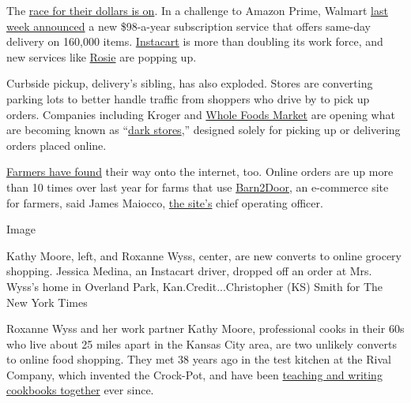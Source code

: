 The
\href{https://www.supermarketnews.com/online-retail/retailers-ramp-their-online-grocery-offerings-amid-continuing-pandemic/gallery?slide=13}{race
for their dollars is on}. In a challenge to Amazon Prime, Walmart
\href{https://www.detroitnews.com/story/business/2020/09/01/years-later-walmart-launches-answer-amazon-prime/113639782/}{last
week announced} a new \$98-a-year subscription service that offers
same-day delivery on 160,000 items.
\href{https://www.instacart.com/?click_id=EAIaIQobChMI3ayi5erP6wIVjMDICh0znwh3EAAYASAAEgIHuvD_BwE\&utm_medium=sem\&utm_source=instacart_google\&utm_campaign=ad_demand_search_brand_mkag_us-na-catchall_exact_us_LTV_Test\&utm_content=accountid-1732890876_campaignid-10842730770_adgroupid-104896959977_device-c\&utm_term=matchtype-e_keyword-instacart_targetid-kwd-297369219725_locationid-9060351\&kskwid=6106173\&ksadid=6107435\&gclid=EAIaIQobChMI3ayi5erP6wIVjMDICh0znwh3EAAYASAAEgIHuvD_BwE}{Instacart}
is more than doubling its work force, and new services like
\href{https://www.rosieapp.com/}{Rosie} are popping up.

Curbside pickup, delivery's sibling, has also exploded. Stores are
converting parking lots to better handle traffic from shoppers who drive
by to pick up orders. Companies including Kroger and
\href{https://www.wholefoodsmarket.com/stores?gclid=EAIaIQobChMIyoev9OrP6wIVYuW1Ch0v0Q-UEAAYASAAEgJILPD_BwE}{Whole
Foods Market} are opening what are becoming known as
``\href{https://www.supermarketnews.com/online-retail/whole-foods-opens-online-only-dark-store-brooklyn}{dark
stores},'' designed solely for picking up or delivering orders placed
online.

\href{https://www.localfarmfinder.com/}{Farmers have found} their way
onto the internet, too. Online orders are up more than 10 times over
last year for farms that use
\href{https://www.barn2door.com/}{Barn2Door,} an e-commerce site for
farmers, said James Maiocco,
\href{https://www.organicauthority.com/buzz-news/you-can-support-local-food-online-meet-barn2door-the-airbnb-of-food}{the
site's} chief operating officer.

Image

Kathy Moore, left, and Roxanne Wyss, center, are new converts to online
grocery shopping. Jessica Medina, an Instacart driver, dropped off an
order at Mrs. Wyss's home in Overland Park, Kan.Credit...Christopher
(KS) Smith for The New York Times

Roxanne Wyss and her work partner Kathy Moore, professional cooks in
their 60s who live about 25 miles apart in the Kansas City area, are two
unlikely converts to online food shopping. They met 38 years ago in the
test kitchen at the Rival Company, which invented the Crock-Pot, and
have been \href{https://www.pluggedintocooking.com/}{teaching and
writing cookbooks together} ever since.

